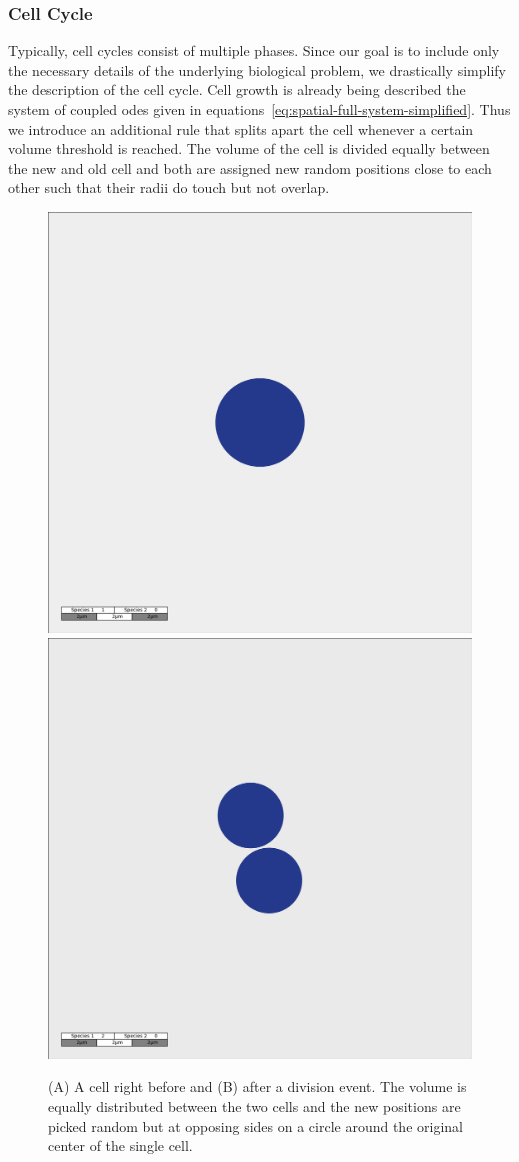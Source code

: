 \documentclass[10pt,A4paper]{article}
\numberwithin{equation}{section}
\begin{document}
\subsubsection{Cell Cycle}
Typically, cell cycles consist of multiple phases.
Since our goal is to include only the necessary details of the underlying biological problem, we drastically simplify the description of the cell cycle.
Cell growth is already being described the system of coupled \acp{ode} given in equations~\eqref{eq:spatial-full-system-simplified}.
Thus we introduce an additional rule that splits apart the cell whenever a certain volume threshold is reached.
The volume of the cell is divided equally between the new and old cell and both are assigned new random positions close to each other such that their radii do touch but not overlap.
\begin{figure}
    \begin{center}
    \includegraphics[width=0.49\columnwidth]{Figures/snapshot-2-cells-before-division.png}%
    \hspace{0.01\columnwidth}%
    \includegraphics[width=0.49\columnwidth]{Figures/snapshot-2-cells-after-division.png}
    \caption{
        (A) A cell right before and (B) after a division event.
        The volume is equally distributed between the two cells and the new positions are picked
        random but at opposing sides on a circle around the original center of the single cell.
    }
    \end{center}
\end{figure}
\end{document}
